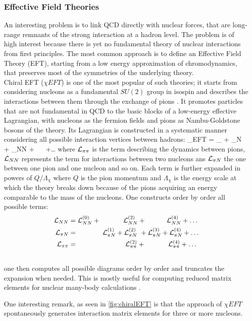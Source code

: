 \subsubsection{Effective Field Theories}
An interesting problem is to link QCD directly with nuclear forces, that are long-range remnants of the strong interaction at a hadron level. The problem is of high interest because there is yet no fundamental theory of nuclear interactions from first principles. The most common approach is to define an Effective Field Theory (EFT), starting from a low energy approximation of chromodynamics, that preserves most of the symmetries of the underlying theory. \\
Chiral EFT ($\chi EFT$) is one of the most popular of such theories; it starts from considering nucleons as a fundamental $SU(2)$ group in isospin and describes the interactions between them through the exchange of pions \cite{machleidt_chiral_2016}. It promotes particles that are not fundamental in QCD to the basic blocks of a low-energy effective Lagrangian, with nucleons as the fermion fields and pions as Nambu-Goldstone bosons \cite{nambu_dynamical_????} of the theory. Its Lagrangian is constructed in a systematic manner considering all possible interaction vertices between hadrons:
\beq
    \Lagr_{\chi EFT} = \Lagr_{\pi\pi} +  \Lagr_{\pi N} + \Lagr_{NN} + ~ ~+\dots
\eeq 
where $\mathcal{L}_{\pi\pi}$ is the term describing the dynamics between pions, $\mathcal{L}_{NN}$ represents the term for interactions between two nucleons ans $\mathcal{L}_{\pi N}$ the one between one pion and one nucleon and so on. Each term is further expanded in powers of $Q/\Lambda_\chi$ where $Q$ is the pion momentum and $\Lambda_\chi$ is the energy scale at which the theory breaks down because of the pions acquiring an energy comparable to the mass of the nucleons. One constructs order by order all possible terms:
\begin{align}
    \mathcal{L}_{NN} &= \mathcal{L}_{NN}^{(0)} + ~~~~~~~~~~  \mathcal{L}_{NN}^{(2)} + ~~~~~~~~~  \mathcal{L}_{NN}^{(4)} + \dots\\\nonumber
    \mathcal{L}_{\pi N} &= ~~~~~~~~~~~ \mathcal{L}_{\pi N}^{(1)} + \mathcal{L}_{\pi N}^{(2)} ~+  \mathcal{L}_{\pi N}^{(3)} + \mathcal{L}_{\pi N}^{(4)} + \dots  \\\nonumber
    \mathcal{L}_{\pi \pi} &= ~~~~~~~~~~~~~~~~~~~~~ \mathcal{L}_{\pi \pi}^{(2)} +  ~~~~~~~~~~  \mathcal{L}_{\pi \pi}^{(4)} + \dots  \\\nonumber
\end{align} 
one then computes all possible diagrams order by order and truncates the expansion when needed. This is mostly useful for computing reduced matrix elements for nuclear many-body calculations \cite{hagen_coupled-cluster_2014}. 

One interesting remark, as seen in \cref{fig:chiralEFT} is that the approach of $\chi EFT$ spontaneously generates interaction matrix elements for three or more nucleons. 